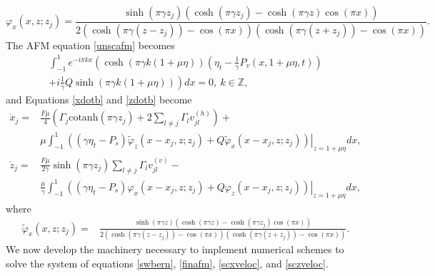 \documentclass[a4paper,11pt]{article}
\begin{document}
\[
\varphi_{x}(x,z;z_{j}) = \frac{\sinh(\pi \gamma z_{j})\left(\cosh(\pi \gamma z_{j})-\cosh(\pi \gamma z)\cos(\pi x)\right)}{2\left(\cosh(\pi\gamma(z-z_{j}))-\cos(\pi x)\right) \left(\cosh(\pi\gamma(z+z_{j}))-\cos(\pi x)\right)}.
\]
The AFM equation \eqref{unscafm} becomes  
\begin{align}
\int_{-1}^{1} e^{-i\pi k x}\left(\cosh\left( \pi\gamma k (1 + \mu \eta)\right)\left(\eta_{t} - \frac{1}{\gamma}P_{v}(x,1+\mu\eta,t) \right) \right.\nonumber\\
\left.+i  \frac{1}{\gamma}Q\sinh\left(\pi \gamma k (1 + \mu \eta)\right)\right) dx = 0,~k\in\mathbb{Z},\label{finafm}
\end{align}
and Equations \eqref{xdotb} and \eqref{zdotb} become
\begin{align}
\dot{x}_{j} = &\frac{F\mu}{4}\left(\Gamma_{j}\mbox{cotanh}\left(\pi \gamma z_{j} \right)+2\sum_{l\neq j}\Gamma_{l}v_{jl}^{(h)} \right)+\label{scxveloc}\\
& \mu \int_{-1}^{1} \left.\left( \left(\gamma \eta_{t}-P_{s} \right) \tilde{\varphi}_{z}(x-x_{j},z;z_{j}) +  Q \tilde{\varphi}_{x}(x-x_{j},z;z_{j}) \right)\right|_{z=1+\mu\eta} dx, \nonumber\\
\dot{z}_{j} = & \frac{F\mu}{2\gamma}\sinh\left( \pi \gamma z_{j}\right)\sum_{l\neq j} \Gamma_{l} v_{jl}^{(v)}-\label{sczveloc}\\
&  \frac{\mu}{\gamma }\int_{-1}^{1} \left.\left(\left(\gamma \eta_{t}-P_{s}\right) \varphi_{x}(x-x_{j},z;z_{j}) + Q \varphi_{z}(x-x_{j},z;z_{j}) \right)\right|_{z=1+\mu\eta}dx, \nonumber
\end{align}
where
\begin{align*}
\tilde{\varphi}_{x}(x,z;z_{j}) = & \frac{\sinh(\pi \gamma z)(\cosh(\pi\gamma z) -\cosh(\pi \gamma z_{j})\cos(\pi x) )}{2(\cosh(\pi\gamma(z-z_{j}))-\cos(\pi x))(\cosh(\pi\gamma(z+z_{j}))-\cos(\pi x))}.
\end{align*}
We now develop the machinery necessary to implement numerical schemes to solve the system of equations \eqref{swbern}, \eqref{finafm}, \eqref{scxveloc}, and \eqref{sczveloc}.  
\end{document}
